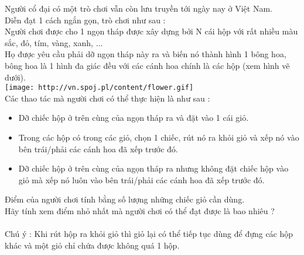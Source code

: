Người cổ đại có một trò chơi vẫn còn lưu truyền tới ngày nay ở   Việt Nam.   
\\   Diễn đạt 1 cách ngắn gọn, trò chơi như sau :   
\\   Người chơi được cho 1 ngọn tháp được xây dựng bởi N cái   hộp với rất nhiều màu sắc, đỏ, tím, vàng, xanh, ...   
\\   Họ được yêu cầu phải dỡ ngọn tháp này ra và biến nó thành   hình 1 bông hoa, bông hoa là 1 hình đa giác đều với các cánh   hoa chính là các hộp (xem hình vẽ dưới).   
\\
\texttt{[image: http://vn.spoj.pl/content/flower.gif]}
\\

   Các thao tác mà người chơi có thể thực hiện là như sau :   
\\
\begin{itemize}
	\item     Dỡ chiếc hộp ở trên cùng của ngọn tháp ra và đặt vào 1 cái   giỏ.   
	\item     Trong các hộp có trong các giỏ, chọn 1 chiếc, rút nó ra   khỏi giỏ và xếp nó vào bên trái/phải các cánh hoa đã xếp trước   đó.   
	\item     Dỡ chiếc hộp ở trên cùng của ngọn tháp ra nhưng không   đặt chiếc hộp vào giỏ mà xếp nó luôn vào bên trái/phải các   cánh hoa đã xếp trước đó.   
\end{itemize}

   Điểm của người chơi tính bằng số lượng những chiếc giỏ cần   dùng.   
\\   Hãy tính xem điểm nhỏ nhất mà người chơi có thể đạt được là   bao nhiêu ?   
\\
\\       Chú ý      : Khi rút hộp ra khỏi giỏ thì giỏ lại có thể tiếp   tục dùng để đựng các hộp khác và một giỏ chỉ chứa được   không quá 1 hộp.   
\\